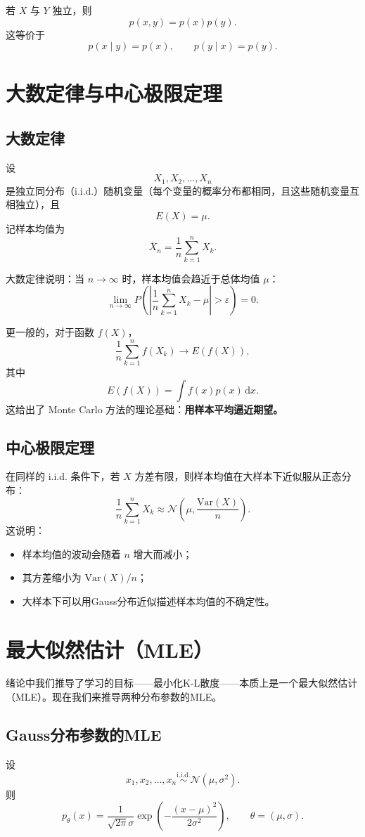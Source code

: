 若 \(X\) 与 \(Y\) 独立，则
\[
p(x,y)=p(x)p(y).
\]
这等价于
\[
p(x\mid y)=p(x),\qquad p(y\mid x)=p(y).
\]

\section{大数定律与中心极限定理}

\subsection{大数定律}

设
\[
X_1,X_2,\dots,X_n
\]
是独立同分布（i.i.d.）随机变量（每个变量的概率分布都相同，且这些随机变量互相独立），且
\[
E(X)=\mu.
\]
记样本均值为
\[
\overline{X}_n=\frac{1}{n}\sum_{k=1}^n X_k.
\]

大数定律说明：当 \(n\to\infty\) 时，样本均值会趋近于总体均值 \(\mu\)：
\[
\lim_{n\to\infty}P\left(\left|\frac{1}{n}\sum_{k=1}^n X_k-\mu\right|>\varepsilon\right)=0.
\]

更一般的，对于函数 \(f(X)\)，
\[
\frac{1}{n}\sum_{k=1}^n f(X_k)\to E(f(X)),
\]
其中
\[
E(f(X))=\int f(x)p(x)\,\mathrm{d}x.
\]
这给出了 Monte Carlo 方法的理论基础：\textbf{用样本平均逼近期望。}

\subsection{中心极限定理}

在同样的 i.i.d. 条件下，若 \(X\) 方差有限，则样本均值在大样本下近似服从正态分布：
\[
\frac{1}{n}\sum_{k=1}^n X_k \approx \mathcal{N}\left(\mu,\frac{\mathrm{Var}(X)}{n}\right).
\]
这说明：

\begin{itemize}
    \item 样本均值的波动会随着 \(n\) 增大而减小；
    \item 其方差缩小为 \(\mathrm{Var}(X)/n\)；
    \item 大样本下可以用Gauss分布近似描述样本均值的不确定性。
\end{itemize}

\section{最大似然估计（MLE）}

绪论中我们推导了学习的目标——最小化K-L散度——本质上是一个最大似然估计（MLE）。现在我们来推导两种分布参数的MLE。

\subsection{Gauss分布参数的MLE}
设
\[
x_1,x_2,\dots,x_n \overset{\mathrm{i.i.d.}}{\sim} \mathcal{N}(\mu,\sigma^2).
\]
则
\[
p_\theta(x)=\frac{1}{\sqrt{2\pi}\sigma}\exp\left(-\frac{(x-\mu)^2}{2\sigma^2}\right),
\qquad
\theta=(\mu,\sigma).
\]

